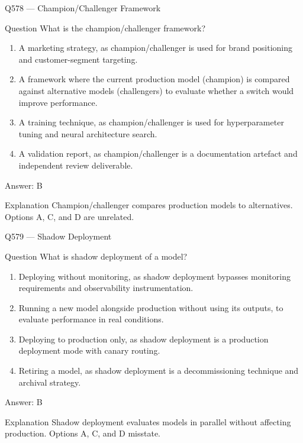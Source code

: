 \documentclass[aspectratio=169,8pt]{beamer}
\begin{document}
	\begin{frame}{Q578 --- Champion/Challenger Framework}
		\begin{block}{Question}
			What is the champion/challenger framework?
			\begin{enumerate}
				\item A marketing strategy, as champion/challenger is used for brand positioning and customer-segment targeting.
				\item A framework where the current production model (champion) is compared against alternative models (challengers) to evaluate whether a switch would improve performance.
				\item A training technique, as champion/challenger is used for hyperparameter tuning and neural architecture search.
				\item A validation report, as champion/challenger is a documentation artefact and independent review deliverable.
			\end{enumerate}
		\end{block}
		\begin{exampleblock}{Answer: B}\end{exampleblock}
		\begin{block}{Explanation}
			Champion/challenger compares production models to alternatives. Options A, C, and D are unrelated.
		\end{block}
	\end{frame}
	
	\begin{frame}{Q579 --- Shadow Deployment}
		\begin{block}{Question}
			What is shadow deployment of a model?
			\begin{enumerate}
				\item Deploying without monitoring, as shadow deployment bypasses monitoring requirements and observability instrumentation.
				\item Running a new model alongside production without using its outputs, to evaluate performance in real conditions.
				\item Deploying to production only, as shadow deployment is a production deployment mode with canary routing.
				\item Retiring a model, as shadow deployment is a decommissioning technique and archival strategy.
			\end{enumerate}
		\end{block}
		\begin{exampleblock}{Answer: B}\end{exampleblock}
		\begin{block}{Explanation}
			Shadow deployment evaluates models in parallel without affecting production. Options A, C, and D misstate.
		\end{block}
	\end{frame}
	
\end{document}
